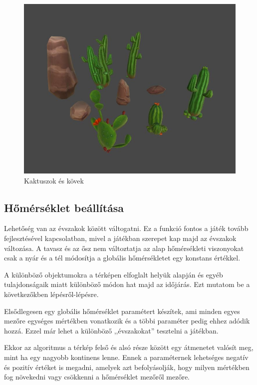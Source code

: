 
\begin{figure}[h!]
\centering
\includegraphics[scale=0.4]{kepek/Cactus.JPG}
\caption[Kaktuszok és kövek]{Kaktuszok és kövek \footnotemark} 
\label{fig:Cactus}
\end{figure}


\subsection{Hőmérséklet beállítása}

Lehetőség van az évszakok között váltogatni. Ez a funkció fontos a játék tovább fejlesztésével kapcsolatban, mivel a játékban szerepet kap majd az évszakok változása. A tavasz és az ősz nem változtatja az alap hőmérsékleti viszonyokat csak a nyár és a tél módosítja a globális hőmérsékletet egy konstans értékkel. 

A különböző objektumokra a térképen elfoglalt helyük alapján és egyéb tulajdonságaik miatt különböző módon hat majd az időjárás. Ezt mutatom be a következőkben lépésről-lépésre.

Elsődlegesen egy globális hőmérséklet paramétert készítek, ami minden egyes mezőre egységes mértékben vonatkozik és a többi paraméter pedig ehhez adódik hozzá. Ezzel már lehet a különböző ,,évszakokat'' tesztelni a játékban.

Ekkor az algoritmus a térkép felső és alsó része között egy átmenetet valósít meg, mint ha egy nagyobb kontinens lenne. Ennek a paraméternek lehetséges negatív és pozitív értéket is megadni, amelyek azt befolyásolják, hogy milyen mértékben fog növekedni vagy csökkenni a hőmérséklet mezőről mezőre.

